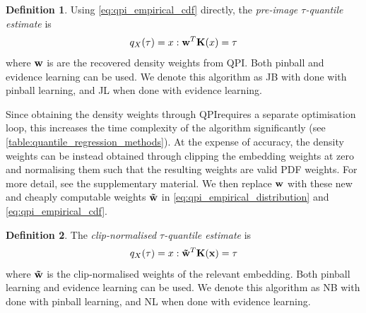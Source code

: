 \documentclass[twoside]{article} \usepackage{aistats2017}
\theoremstyle{definition}
\newtheorem{definition}{Definition}[section]
\theoremstyle{theorem}
\newcommand{\rv}[1]{{#1}}
\newcommand{\qpi}{QPI}
\begin{document}
	\theoremstyle{definition}
	\begin{definition}
		Using \eqref{eq:qpi_empirical_cdf} directly, the \textit{pre-image $\tau$-quantile estimate} is
		\begin{equation}
			q_{\rv{X}}(\tau) = x : \bvec{w}^{T} \bvec{K}(x) = \tau
		\end{equation}	
		where $\mathbf{w}$ is are the recovered density weights from QPI.
		Both pinball and evidence learning can be used. We denote this algorithm as JB with done with pinball learning, and JL when done with evidence learning.
	\end{definition}
	
	Since obtaining the density weights through \qpi\space requires a separate optimisation loop, this increases the time complexity of the algorithm significantly (see \cref{table:quantile_regression_methods}). At the expense of accuracy, the density weights can be instead obtained through clipping the embedding weights at zero and normalising them such that the resulting weights are valid PDF weights. For more detail, see the supplementary material. We then replace $\mathbf{w}$ with these new and cheaply computable weights $\mathbf{\tilde{w}}$ in \eqref{eq:qpi_empirical_distribution} and \eqref{eq:qpi_empirical_cdf}.

	\theoremstyle{definition}
	\begin{definition}
		The \textit{clip-normalised $\tau$-quantile estimate} is
		\begin{equation}
		q_{\rv{X}}(\tau) = x : \bvec{\tilde{w}}^{T} \bvec{K}(\bvec{x}) = \tau
		\end{equation}
		where $\mathbf{\tilde{w}}$ is the clip-normalised weights of the relevant embedding.
		Both pinball learning and evidence learning can be used. We denote this algorithm as NB with done with pinball learning, and NL when done with evidence learning.
	\end{definition}	
	
\end{document}
